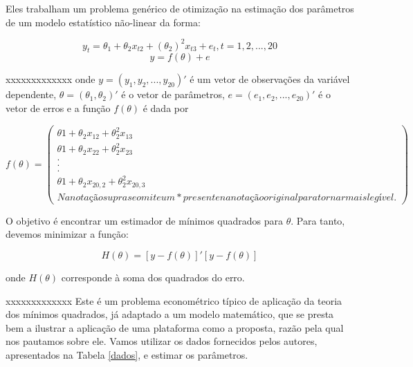\documentclass{abnt}
\begin{document}
Eles trabalham um problema genérico de otimização na estimação dos parâmetros de um modelo  estatístico não-linear da forma:

\[ y_t = \theta_1 + \theta_2 x_{t2} + (\theta_2)^2 x_{t3} +e_t , t = 1,2,...,20 \]
\[ y = f(\theta)+e\]

xxxxxxxxxxxxx
	onde $y = (y_1, y_2, ..., y_{20})'$ é um vetor de observações da variável dependente, $\theta = (\theta_1, \theta_2)'$ é o vetor de parâmetros, $e = (e_1, e_2, ..., e_{20})'$ é o vetor de erros e a função $f(\theta)$ é dada por 

\[ f(\theta)=
        \left( \begin{array}{ccc}
\theta1 + \theta_2 x_{12} + \theta_2^2 x_{13} \\
\theta1 + \theta_2 x_{22} + \theta_2^2 x_{23} \\
.\\
.\\
.\\
\theta1 + \theta_2 x_{20,2} + \theta_2^2 x_{20,3} \\

Na notação supra se omite um * presente na notação original para tornar mais legível.

\end{array} \right)\
 \]
 
 O objetivo é encontrar um estimador de mínimos quadrados para $\theta$. Para tanto, devemos minimizar a função:
 
\begin{equation}
  \label{eq_H}
  H(\theta) = [y - f(\theta)]'[y - f(\theta)] 
\end{equation}

onde $H(\theta)$ corresponde à soma dos quadrados do erro.

xxxxxxxxxxxxx
	Este é um problema econométrico típico de aplicação da teoria dos mínimos quadrados, já adaptado a um modelo matemático, que se presta bem a ilustrar a aplicação de uma plataforma como a proposta, razão pela qual nos pautamos sobre ele. Vamos utilizar os dados fornecidos pelos autores, apresentados na Tabela \ref{dados}, e estimar os parâmetros.
\end{document}
